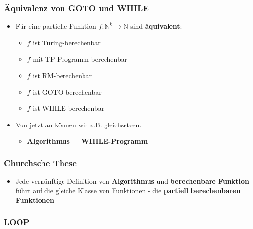 \documentclass{scrartcl}
\begin{document}
\subsubsection{Äquivalenz von GOTO und WHILE}

\begin{itemize}
	\item Für eine partielle Funktion $f: \mathbb{N}^k \rightarrow \mathbb{N}$ sind \textbf{äquivalent}:
	\begin{itemize}
		\item $f$ ist Turing-berechenbar
		\item $f$ mit TP-Programm berechenbar
		\item $f$ ist RM-berechenbar
		\item $f$ ist GOTO-berechenbar
		\item $f$ ist WHILE-berechenbar
	\end{itemize}
	\item Von jetzt an können wir z.B. gleichsetzen:
	\begin{itemize}
		\item \textbf{Algorithmus = WHILE-Programm}
	\end{itemize}
\end{itemize}

\subsubsection{Churchsche These}

\begin{itemize}
	\item Jede vernünftige Definition von \textbf{Algorithmus} und \textbf{berechenbare Funktion} führt auf die gleiche Klasse von Funktionen - die \textbf{partiell berechenbaren Funktionen}
\end{itemize}

\subsubsection{LOOP}
\end{document}
